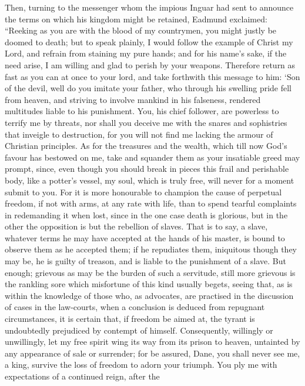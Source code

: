 \documentclass[10pt]{book}
\begin{document}
\begin{paracol}{2}
\switchcolumn

Then, turning to the messenger whom the impious Inguar had sent to announce the terms on which his kingdom might be retained, Eadmund exclaimed: ``Reeking as you are with the blood of my countrymen, you might justly be doomed to death; but to speak plainly, I would follow the example of Christ my Lord, and refrain from staining my pure hands; and for his name's sake, if the need arise, I am willing and glad to perish by your weapons. Therefore return as fast as you can at once to your lord, and take forthwith this message to him: `Son of the devil, well do you imitate your father, who through his swelling pride fell from heaven, and striving to involve mankind in his falseness, rendered multitudes liable to his punishment. You, his chief follower, are powerless to terrify me by threats, nor shall you deceive me with the snares and sophistries that inveigle to destruction, for you will not find me lacking the armour of Christian principles. As for the treasures and the wealth, which till now God's favour has bestowed on me, take and squander them as your insatiable greed may prompt, since, even though you should break in pieces this frail and perishable body, like a potter's vessel, my soul, which is truly free, will never for a moment submit to you. For it is more honourable to champion the cause of perpetual freedom, if not with arms, at any rate with life, than to spend tearful complaints in redemanding it when lost, since in the one case death is glorious, but in the other the opposition is but the rebellion of slaves. That is to say, a slave, whatever terms he may have accepted at the hands of his master, is bound to observe them as he accepted them; if he repudiates them, iniquitous though they may be, he is guilty of treason, and is liable to the punishment of a slave. But enough; grievous as may be the burden of such a servitude, still more grievous is the rankling sore which misfortune of this kind usually begets, seeing that, as is within the knowledge of those who, as advocates, are practised in the discussion of cases in the law-courts, when a conclusion is deduced from repugnant circumstances, it is certain that, if freedom be aimed at, the tyrant is undoubtedly prejudiced by contempt of himself. Consequently, willingly or unwillingly, let my free spirit wing its way from its prison to heaven, untainted by any appearance of sale or surrender; for be assured, Dane, you shall never see me, a king, survive the loss of freedom to adorn your triumph. You ply me with expectations of a continued reign, after the\linebreak{}

\end{paracol}
\end{document}
